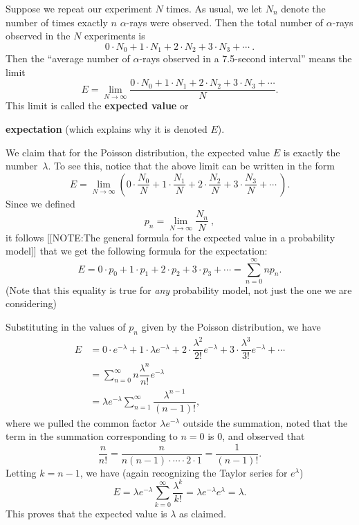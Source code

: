 Suppose we repeat our experiment $N$ times.  As usual, we let $N_n$
denote the number of times exactly $n$ $\alpha$-rays were observed.
Then the total number of $\alpha$-rays observed in the $N$ experiments
is
\[
0\cdot N_0 + 1\cdot N_1 + 2\cdot N_2 + 3\cdot N_3 + \cdots\ .
\]
Then the ``average number of $\alpha$-rays observed in a 7.5-second
interval'' means the limit
\[
E = \lim_{N\to\infty} 
    \dfrac{0\cdot N_0 + 1\cdot N_1 + 2\cdot N_2 + 3\cdot N_3 + \cdots}
    {N}.
\]
This limit is called the {\bf expected value} or

{\bf expectation} (which explains why it is denoted $E$).

We claim that for the Poisson distribution, the expected value $E$ is
exactly the number~$\lambda$.  To see this, notice that the above
limit can be written in the form
\[
E = \lim_{N\to\infty} \left( 0 \cdot \dfrac{N_0}{N} + 1\cdot \dfrac{N_1}{N}
      +  2\cdot \dfrac{N_2}{N} + 3\cdot \dfrac{N_3}{N} + \cdots\ \right).
\]
Since we defined
\[p_n = \lim_{N\to\infty} \dfrac{N_n}{N}\ ,\]
it follows 
[[NOTE:The general formula for the expected value in a probability model]]
that we get the following formula for the expectation:
\[
E = 0\cdot p_0 + 1\cdot p_1 + 2\cdot p_2 + 3\cdot p_3 + \cdots =
        \sum_{n=0}^\infty np_n.
\]
(Note that this equality is true for {\em any} probability model, not
just the one we are considering)

Substituting in the values of $p_n$ given by the Poisson distribution,  we have
\begin{align*}
E &= 0\cdot e^{-\lambda} + 1\cdot \lambda e^{-\lambda} + 
        2\cdot \dfrac{\lambda ^2}{2!} e^{-\lambda} + 
        3\cdot \dfrac{\lambda ^3}{3!}e^{-\lambda} + \cdots \\
  &= \sum_{n=0}^\infty n \dfrac{\lambda ^n}{n!}e^{-\lambda}\\
  &= \lambda e^{-\lambda}\sum_{n=1}^\infty \dfrac{\lambda ^{n-1}}{(n-1)!},
\end{align*}
where we pulled the common factor $\lambda e^{-\lambda}$ outside the
summation, noted that the term in the summation corresponding to $n=0$
is 0, and observed that
\[
\dfrac{n}{n!} = \dfrac{n}{n(n-1)\cdot\cdots\cdot2\cdot 1} 
   = \dfrac{1}{(n-1)!}.
\] Letting $k=n-1$, we have (again recognizing the Taylor series for
   $e^{\lambda}$)
\[
E =  \lambda e^{-\lambda}\sum_{k=0}^\infty \dfrac{\lambda ^k}{k!}
  = \lambda e^{-\lambda}e^{\lambda}
  = \lambda.
\]
This proves that the expected value is $\lambda$ as claimed.

